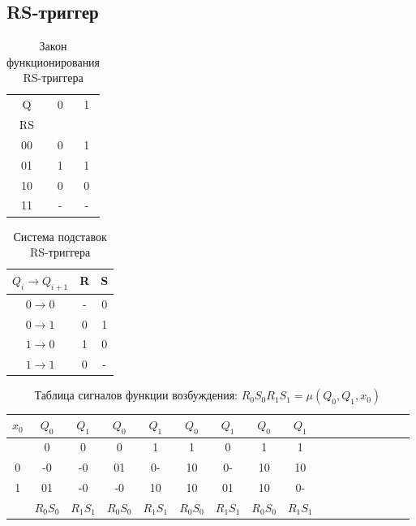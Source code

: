 \documentclass[a4paper,10pt]{article}
\begin{document}
    \subsection*{RS-триггер}
            \begin{table}[h!]
                \center
                \begin{tabular}{|c|c|c|}
                    \hline
                     Q  & 0 & 1 \\
                     RS &   &   \\ \hline
                     00 & 0 & 1 \\ \hline
                     01 & 1 & 1 \\ \hline
                     10 & 0 & 0 \\ \hline
                     11 & - & - \\ \hline
                \end{tabular}
                \caption{Закон функционирования RS-триггера}
            \end{table}
            \begin{table}[h!]
                \center
                \begin{tabular}{|c|c|c|}
                    \hline
            $Q_i \to Q_{i+1}$  & R & S \\ \hline
                     $0 \to 0$ & - & 0 \\ \hline
                     $0 \to 1$ & 0 & 1 \\ \hline
                     $1 \to 0$ & 1 & 0 \\ \hline
                     $1 \to 1$ & 0 & - \\ \hline
                \end{tabular}
                \caption{Система подставок RS-триггера}
            \end{table}
            \begin{table}[h!]
                \center
                \begin{tabular}{|c||c|c||c|c||c|c||c|c||c|c||c|c||c|c||c|c|}
                 \hline
                 $x_0$ &  $Q_0$ & $Q_1$  &  $Q_0$ & $Q_1$  &  $Q_0$ & $Q_1$  &  $Q_0$ & $Q_1$ \\ \hline
                       &    0   &   0    &    0   &   1    &    1   &   0    &    1   &   1   \\ \hline
                    0  &   -0   &  -0    &   01   &  0-    &   10   &  0-    &   10   &  10   \\ \hline
                    1  &   01   &  -0    &   -0   &  10    &   10   &  01    &   10   &  0-   \\ \hline
                       &$R_0S_0$&$R_1S_1$&$R_0S_0$&$R_1S_1$&$R_0S_0$&$R_1S_1$&$R_0S_0$&$R_1S_1$ \\ \hline
                \end{tabular}
                \caption{Таблица сигналов функции возбуждения: $R_0S_0R_1S_1 = \mu(Q_0,Q_1,x_0)$}
            \end{table}
\end{document}
